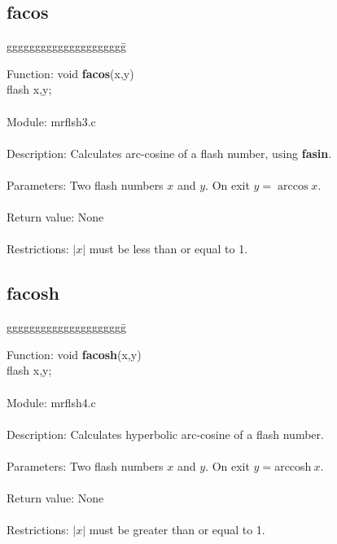 \subsection{facos}

\begin{tabbing}
ggggggggggggggggggggg\= \kill


      Function:      \>void {\bf facos}(x,y) \\
                     \>flash x,y; \\
      \ \\
      Module:        \>mrflsh3.c \\
      \ \\
      Description:   \>Calculates arc-cosine of a flash number, using {\bf fasin}. \\
      \ \\
      Parameters:    \>Two flash numbers $x$ and $y$. On exit $y=\arccos x$. \\
      \ \\
      Return value:  \>None  \\
      \ \\
      Restrictions:  \>$|x|$ must be less than or equal to 1. \\

\end{tabbing}
\subsection{facosh}

\begin{tabbing}
ggggggggggggggggggggg\= \kill

      Function:      \>void {\bf facosh}(x,y) \\
                     \>flash x,y; \\
      \ \\
      Module:        \>mrflsh4.c \\
      \ \\
      Description:   \>Calculates hyperbolic arc-cosine of a flash number. \\
      \ \\
      Parameters:    \>Two flash numbers $x$ and $y$. On exit $y=$arccosh$\ x$. \\
      \ \\
      Return value:  \>None \\ 
      \ \\
      Restrictions:  \>$|x|$ must be greater than or equal to 1. \\
\end{tabbing}
\pagebreak

